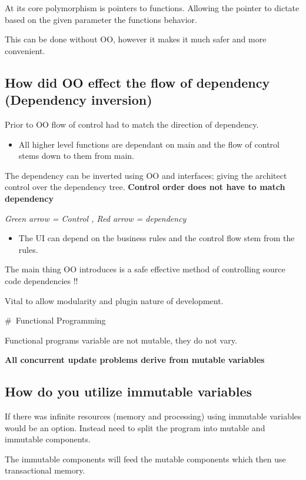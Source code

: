 \documentclass[11pt]{scrartcl} %
\begin{document}
At its core polymorphism is pointers to functions. Allowing the pointer
to dictate based on the given parameter the functions behavior.

This can be done without OO, however it makes it much safer and more
convenient.

\subsection{How did OO effect the flow of dependency (Dependency
inversion)}

Prior to OO flow of control had to match the direction of dependency.

\begin{itemize}
\item
  All higher level functions are dependant on main and the flow of
  control stems down to them from main.
\end{itemize}

The dependency can be inverted using OO and interfaces; giving the
architect control over the dependency tree. \textbf{Control order does
not have to match dependency}

\emph{Green arrow = Control , Red arrow = dependency}

\begin{itemize}
\item
  The UI can depend on the business rules and the control flow stem from
  the rules.
\end{itemize}

The main thing OO introduces is a safe effective method of controlling
source code dependencies !!

Vital to allow modularity and plugin nature of development.

\#~Functional Programming

Functional programs variable are not mutable, they do not vary.

\textbf{All concurrent update problems derive from mutable variables}

\subsection{How do you utilize immutable variables}

If there was infinite resources (memory and processing) using immutable
variables would be an option. Instead need to split the program into
mutable and immutable components.

The immutable components will feed the mutable components which then use
transactional memory.
\end{document}

